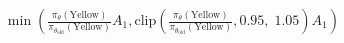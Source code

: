 \documentclass[preview]{standalone}
\begin{document}
\begin{align*}
\min \left(\frac{\pi_\theta(\text{Yellow})}{\pi_{\theta_{\text{old}}}(\text{Yellow})} A_1, \text{clip} \left( \frac{\pi_\theta(\text{Yellow})}{\pi_{\theta_{\text{old}}}(\text{Yellow})}, 0.95,\; 1.05 \right) A_1 \right)
\end{align*}
\end{document}
